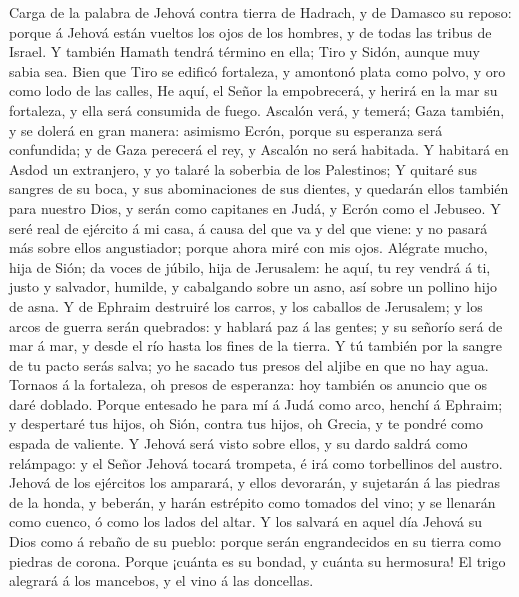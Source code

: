  Carga de la palabra de Jehová contra tierra de Hadrach, y
de Damasco su reposo: porque á Jehová están vueltos los ojos de los
hombres, y de todas las tribus de Israel.  Y también
Hamath tendrá término en ella; Tiro y Sidón, aunque muy sabia sea.
 Bien que Tiro se edificó fortaleza, y amontonó plata como
polvo, y oro como lodo de las calles,  He aquí, el Señor
la empobrecerá, y herirá en la mar su fortaleza, y ella será consumida
de fuego.  Ascalón verá, y temerá; Gaza también, y se
dolerá en gran manera: asimismo Ecrón, porque su esperanza será
confundida; y de Gaza perecerá el rey, y Ascalón no será habitada.
 Y habitará en Asdod un extranjero, y yo talaré la
soberbia de los Palestinos;  Y quitaré sus sangres de su
boca, y sus abominaciones de sus dientes, y quedarán ellos también para
nuestro Dios, y serán como capitanes en Judá, y Ecrón como el Jebuseo.
 Y seré real de ejército á mi casa, á causa del que va y
del que viene: y no pasará más sobre ellos angustiador; porque ahora
miré con mis ojos.  Alégrate mucho, hija de Sión; da voces
de júbilo, hija de Jerusalem: he aquí, tu rey vendrá á ti, justo y
salvador, humilde, y cabalgando sobre un asno, así sobre un pollino hijo
de asna.  Y de Ephraim destruiré los carros, y los
caballos de Jerusalem; y los arcos de guerra serán quebrados: y hablará
paz á las gentes; y su señorío será de mar á mar, y desde el río hasta
los fines de la tierra.  Y tú también por la sangre de tu
pacto serás salva; yo he sacado tus presos del aljibe en que no hay
agua.  Tornaos á la fortaleza, oh presos de esperanza:
hoy también os anuncio que os daré doblado.  Porque
entesado he para mí á Judá como arco, henchí á Ephraim; y despertaré tus
hijos, oh Sión, contra tus hijos, oh Grecia, y te pondré como espada de
valiente.  Y Jehová será visto sobre ellos, y su dardo
saldrá como relámpago: y el Señor Jehová tocará trompeta, é irá como
torbellinos del austro.  Jehová de los ejércitos los
amparará, y ellos devorarán, y sujetarán á las piedras de la honda, y
beberán, y harán estrépito como tomados del vino; y se llenarán como
cuenco, ó como los lados del altar.  Y los salvará en
aquel día Jehová su Dios como á rebaño de su pueblo: porque serán
engrandecidos en su tierra como piedras de corona. 
Porque ¡cuánta es su bondad, y cuánta su hermosura! El trigo alegrará á
los mancebos, y el vino á las doncellas.

